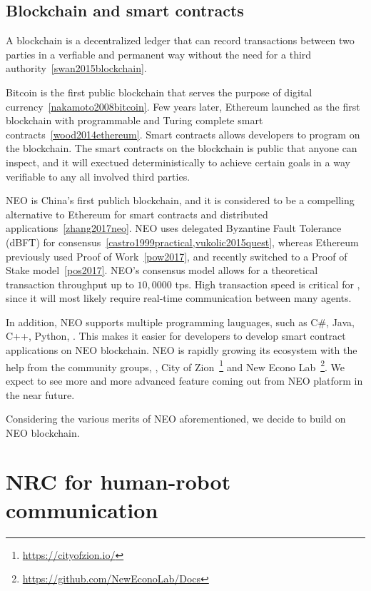 \documentclass{article}
\begin{document}
\subsection{Blockchain and smart contracts}
\label{subsec:blockchain}

A blockchain is a decentralized ledger that can record
transactions between two parties in a verfiable and permanent
way without the need for a third authority~\cref{swan2015blockchain}.

Bitcoin is the first public blockchain that serves the purpose
of digital currency~\cref{nakamoto2008bitcoin}.
Few years later, Ethereum launched as the first blockchain with
programmable and Turing complete smart contracts~\cref{wood2014ethereum}.
Smart contracts allows developers to program on the blockchain.
The smart contracts on the blockchain is public that anyone
can inspect, and it will exectued deterministically to achieve
certain goals in a way verifiable to any all involved third
parties.

NEO is China's first publich blockchain, and it is considered to
be a compelling alternative to Ethereum for smart contracts and
distributed applications~\cref{zhang2017neo}.
NEO uses delegated Byzantine Fault Tolerance (dBFT) for 
consensus~\cref{castro1999practical,vukolic2015quest}, 
whereas Ethereum previously used Proof
of Work~\cref{pow2017}, and recently switched to a Proof of Stake
model~\cref{pos2017}.
NEO’s consensus model allows for 
a theoretical transaction throughput up to $10,0000$ tps.
High transaction speed is critical for \nrc, 
since it will most likely require 
real-time communication between many agents.


In addition, NEO supports multiple programming lauguages, such as C\#, Java,
C++, Python, \etc. This makes it easier for developers to develop
smart contract applications on NEO blockchain. 
NEO is rapidly growing its ecosystem with the help from the 
community groups, \eg, City of Zion~\footnote{\url{https://cityofzion.io/}} 
and New Econo Lab~\footnote{\url{https://github.com/NewEconoLab/Docs}}.
We expect to see more and more advanced feature coming out from NEO
platform in the near future.

Considering the various merits of NEO aforementioned, we decide to build
\nrc on NEO blockchain.


\section{NRC for human-robot communication}
\label{sec:nrc}
\end{document}
